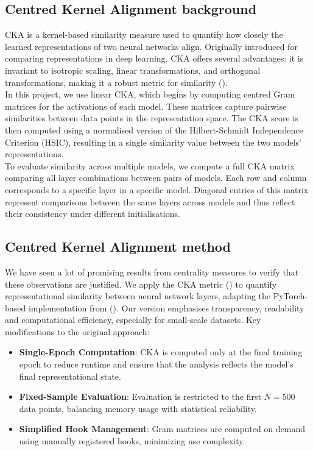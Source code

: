 
\subsection{Centred Kernel Alignment background }\label{CKA}
CKA is a kernel-based similarity measure used to quantify how closely the learned representations of two neural networks align. Originally introduced for comparing representations in deep learning, CKA offers several advantages: it is invariant to isotropic scaling, linear transformations, and orthogonal transformations, making it a robust metric for similarity (\cite{Hinton}).
\vspace{0.5em}\\
In this project, we use linear CKA, which begins by computing centred Gram matrices for the activations of each model. These matrices capture pairwise similarities between data points in the representation space. The CKA score is then computed using a normalised version of the Hilbert-Schmidt Independence Criterion (HSIC), resulting in a single similarity value between the two models’ representations.
\vspace{0.5em}\\
To evaluate similarity across multiple models, we compute a full CKA matrix comparing all layer combinations between pairs of models. Each row and column corresponds to a specific layer in a specific model. Diagonal entries of this matrix represent comparisons between the same layers across models and thus reflect their consistency under different initialisations.

\subsection{Centred Kernel Alignment method}
We have seen a lot of promising results from centrality measures to verify that these observations are justified. We apply the CKA metric (\cite{Hinton}) to quantify representational similarity between neural network layers, adapting the PyTorch-based implementation from (\cite{numpeecka}). Our version emphasises transparency, readability and computational efficiency, especially for small-scale datasets. Key modifications to the original approach:

\begin{itemize}
    \item \textbf{Single-Epoch Computation}: CKA is computed only at the final training epoch to reduce runtime and ensure that the analysis reflects the model's final representational state.
    \item \textbf{Fixed-Sample Evaluation}: Evaluation is restricted to the first $N=500$ data points, balancing memory usage with statistical reliability.
    \item \textbf{Simplified Hook Management}: Gram matrices are computed on demand using manually registered hooks, minimizing use complexity.
\end{itemize}

